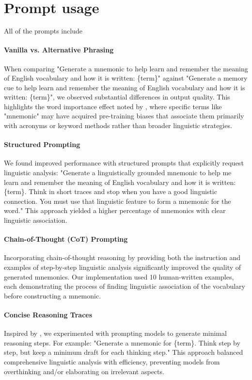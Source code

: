\documentclass[11pt]{article}
\begin{document}
\section{Prompt usage} \label{app:prompt-usage}

All of the prompts include

\paragraph{Vanilla vs. Alternative Phrasing} When comparing "Generate a mnemonic to help learn and remember the meaning of English vocabulary and how it is written: \{term\}" against "Generate a memory cue to help learn and remember the meaning of English vocabulary and how it is written: \{term\}", we observed substantial differences in output quality. This highlights the word importance effect noted by \citet{hackmannWordImportanceExplains2024}, where specific terms like "mnemonic" may have acquired pre-training biases that associate them primarily with acronyms or keyword methods rather than broader linguistic strategies.

\paragraph{Structured Prompting} We found improved performance with structured prompts that explicitly request linguistic analysis: "Generate a linguistically grounded mnemonic to help me learn and remember the meaning of English vocabulary and how it is written: \{term\}. Think in short traces and stop when you have a good linguistic connection. You must use that linguistic feature to form a mnemonic for the word." This approach yielded a higher percentage of mnemonics with clear linguistic association.

\paragraph{Chain-of-Thought (CoT) Prompting} Incorporating chain-of-thought reasoning by providing both the instruction and examples of step-by-step linguistic analysis significantly improved the quality of generated mnemonics. Our implementation used 10 human-written examples, each demonstrating the process of finding linguistic association of the vocabulary before constructing a mnemonic.

\paragraph{Concise Reasoning Traces} Inspired by \citet{xuChainDraftThinking2025}, we experimented with prompting models to generate minimal reasoning steps. For example: "Generate a mnemonic for \{term\}. Think step by step, but keep a minimum draft for each thinking step." This approach balanced comprehensive linguistic analysis with efficiency, preventing models from overthinking and/or elaborating on irrelevant aspects.
\end{document}
